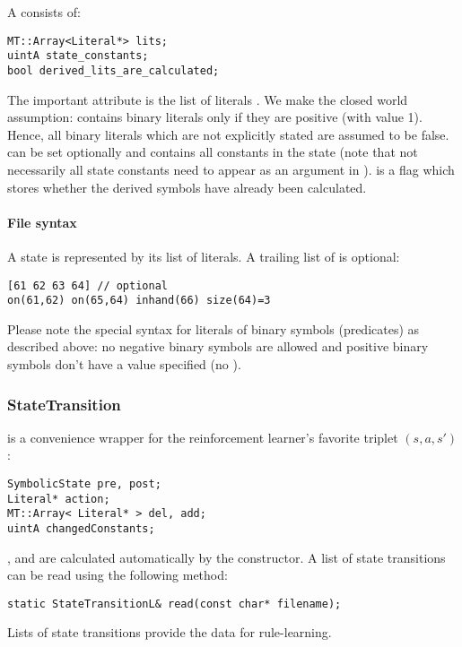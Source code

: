 \documentclass[10pt,twoside,twocolumn,fleqn]{article}
\begin{document}
A  consists of:
\begin{lstlisting}
MT::Array<Literal*> lits;
uintA state_constants;
bool derived_lits_are_calculated;
\end{lstlisting}
The important attribute is the list of literals . We make the 
closed world assumption:  contains binary literals only if
they are positive (with value 1). Hence, all binary literals which are not
explicitly stated are assumed to be false.  can be
set optionally and contains all constants in the state (note that not
necessarily all state constants need to appear as an argument in
).  is a flag which stores
whether the derived symbols have already been calculated.



\paragraph{File syntax}

A state is represented by its list of literals. A trailing list of
 is optional:
\begin{lstlisting}
[61 62 63 64] // optional
on(61,62) on(65,64) inhand(66) size(64)=3
\end{lstlisting}
Please note the special syntax for literals of binary symbols
(predicates) as described above: no negative binary symbols are allowed
and positive binary symbols don't have a value specified (no ).



\subsubsection{StateTransition}
\label{sec:state-transition}

 is a convenience wrapper for the reinforcement
learner's favorite triplet $(s,a,s')$:
\begin{lstlisting}
SymbolicState pre, post;
Literal* action;
MT::Array< Literal* > del, add;
uintA changedConstants;
\end{lstlisting}
,  and  are calculated
automatically by the constructor. A list of state transitions can be read
using the following method:
\begin{lstlisting}
static StateTransitionL& read(const char* filename);
\end{lstlisting}
Lists of state transitions provide the data for rule-learning.
\end{document}
